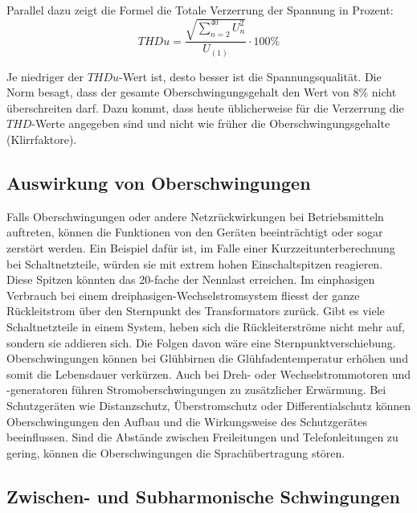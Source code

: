 Parallel dazu zeigt die Formel die Totale Verzerrung der Spannung in Prozent:
\begin{equation}\label{eq:THDu}
THDu = \frac{\sqrt{\sum_{n=2}^{40} U_n^2}}{U_{(1)}} \cdot 100\%
\end{equation}


Je niedriger der $THDu$-Wert ist, desto besser ist die Spannungsqualität. Die Norm besagt, dass der gesamte Oberschwingungsgehalt den Wert von 8\% nicht überschreiten darf. Dazu kommt, dass heute üblicherweise für die Verzerrung die $THD$-Werte angegeben sind und nicht wie früher die Oberschwingungsgehalte (Klirrfaktore).\\


\subsection{Auswirkung von Oberschwingungen}

Falls Oberschwingungen oder andere Netzrückwirkungen bei Betriebsmitteln auftreten, können die Funktionen von den Geräten beeinträchtigt oder sogar zerstört werden. Ein Beispiel dafür ist, im Falle einer Kurzzeitunterberechnung bei Schaltnetzteile, würden sie mit extrem hohen Einschaltspitzen reagieren. Diese Spitzen könnten das 20-fache der Nennlast erreichen. Im einphasigen Verbrauch bei einem dreiphasigen-Wechselstromsystem fliesst der ganze Rückleitstrom über den Sternpunkt des Transformators zurück. Gibt es viele Schaltnetzteile in einem System, heben sich die Rückleiterströme nicht mehr auf, sondern sie addieren sich. Die Folgen davon wäre eine Sternpunktverschiebung. Oberschwingungen können bei Glühbirnen die Glühfadentemperatur erhöhen und somit die Lebensdauer verkürzen. Auch bei Dreh- oder Wechselstrommotoren und -generatoren führen Stromoberschwingungen zu zusätzlicher Erwärmung. Bei Schutzgeräten wie Distanzschutz, Überstromschutz oder Differentialschutz können Oberschwingungen den Aufbau und die Wirkungsweise des Schutzgerätes beeinflussen. Sind die Abstände zwischen Freileitungen und Telefonleitungen zu gering, können die Oberschwingungen die Sprachübertragung stören.


\subsection{Zwischen- und Subharmonische Schwingungen}

